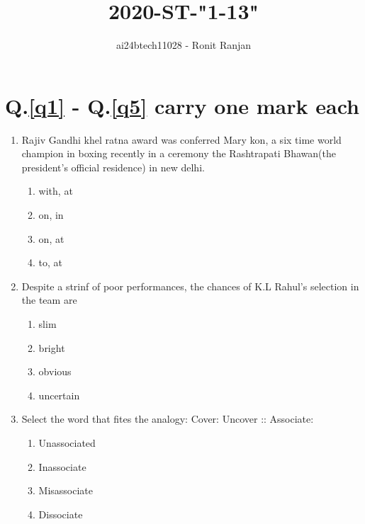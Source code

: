 \documentclass[journal,12pt,onecolumn]{IEEEtran}
\theoremstyle{remark}
\begin{document}

\vspace{3cm}

\title{2020-ST-"1-13"}
\author{ai24btech11028 - Ronit Ranjan}
\maketitle
\bigskip

\section*{Q.\ref{q1} - Q.\ref{q5} carry one mark each}

\begin{enumerate}
    \item \label{q1} Rajiv Gandhi khel ratna award was conferred \underline{\hspace{2cm}}Mary kon, a six time world champion in boxing recently in a ceremony \underline{\hspace{2cm}} the Rashtrapati Bhawan(the president's official residence) in new delhi.
    \begin{enumerate}
        \item with, at
        \item on, in
        \item on, at
        \item to, at
    \end{enumerate}

    \item Despite a strinf of poor performances, the chances of K.L Rahul's selection in the team are\underline{\hspace{2cm}}
    \begin{enumerate}
        \item slim
        \item bright
        \item obvious
        \item uncertain
    \end{enumerate}

    \item Select the word that fites the analogy:
    Cover: Uncover :: Associate: \underline{\hspace{2cm}}
    \begin{enumerate}
        \item Unassociated
        \item Inassociate
        \item Misassociate
        \item Dissociate
    \end{enumerate}


\end{enumerate}
\end{document}
